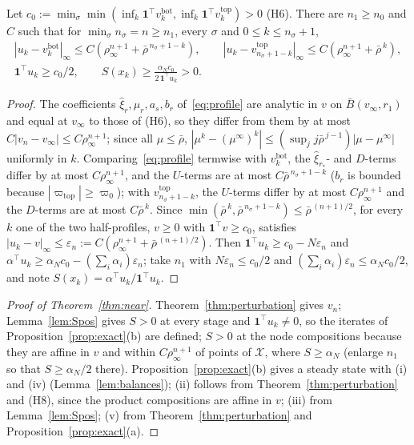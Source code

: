 \documentclass[11pt,a4paper]{report}
\newcommand{\cX}{\mathcal X}
\newcommand{\one}{\mathbf 1}
\newcommand{\piv}{\varpi}
\begin{document}
\begin{lemma}\label{lem:Spos}
Let \(c_0:=\min_\sigma\min(\inf_k\one^\top v^{\mathrm{bot}}_k,\inf_k\one^\top v^{\mathrm{top}}_k)>0\) (H6). There are \(n_1\ge n_0\) and \(C\) such that for
\(\min_\sigma n_\sigma=n\ge n_1\), every \(\sigma\) and \(0\le k\le n_\sigma+1\),
\begin{gather*}
|u_k-v^{\mathrm{bot}}_k|_\infty\le C(\rho_\infty^{n+1}+\bar\rho^{\,n_\sigma+1-k}),\qquad
|u_k-v^{\mathrm{top}}_{n_\sigma+1-k}|_\infty\le C(\rho_\infty^{n+1}+\bar\rho^{\,k}),\\
\one^\top u_k\ge c_0/2,\qquad S(x_k)\ge\frac{\alpha_Nc_0}{2\,\one^\top u_k}>0 .
\end{gather*}
\end{lemma}
\begin{proof}
The coefficients \(\hat\xi_r,\mu_r,a_s,b_r\) of~\eqref{eq:profile} are analytic in \(v\) on \(\bar B(v_\infty,r_1)\) and equal at \(v_\infty\) to those of
(H6), so they differ from them by at most \(C|v_n-v_\infty|\le C\rho_\infty^{n+1}\); since all \(\mu\le\bar\rho\),
\(|\mu^k-(\mu^\infty)^k|\le(\sup_jj\bar\rho^{\,j-1})|\mu-\mu^\infty|\) uniformly in \(k\). Comparing~\eqref{eq:profile} termwise with
\(v^{\mathrm{bot}}_k\), the \(\hat\xi_{r_*}\)- and \(D\)-terms differ by at most \(C\rho_\infty^{n+1}\), and the \(U\)-terms are at most
\(C\bar\rho^{\,n_\sigma+1-k}\) (\(b_r\) is bounded because \(|\piv_{\mathrm{top}}|\ge\piv_0\)); with \(v^{\mathrm{top}}_{n_\sigma+1-k}\), the \(U\)-terms differ by at
most \(C\rho_\infty^{n+1}\) and the \(D\)-terms are at most \(C\bar\rho^{\,k}\). Since \(\min(\bar\rho^{\,k},\bar\rho^{\,n_\sigma+1-k})\le\bar\rho^{\,(n+1)/2}\),
for every \(k\) one of the two half-profiles, \(v\ge0\) with \(\one^\top v\ge c_0\), satisfies \(|u_k-v|_\infty\le\varepsilon_n:=C(\rho_\infty^{n+1}+\bar\rho^{\,(n+1)/2})\).
Then \(\one^\top u_k\ge c_0-N\varepsilon_n\) and \(\alpha^\top u_k\ge\alpha_Nc_0-(\sum_i\alpha_i)\varepsilon_n\); take \(n_1\) with \(N\varepsilon_n\le c_0/2\) and
\((\sum_i\alpha_i)\varepsilon_n\le\alpha_Nc_0/2\), and note \(S(x_k)=\alpha^\top u_k/\one^\top u_k\).
\end{proof}

\begin{proof}[Proof of Theorem~\ref{thm:near}]
Theorem~\ref{thm:perturbation} gives \(v_n\); Lemma~\ref{lem:Spos} gives \(S>0\) at every stage and \(\one^\top u_k\ne0\), so the iterates of
Proposition~\ref{prop:exact}(b) are defined; \(S>0\) at the node compositions because they are affine in \(v\) and within
\(C\rho_\infty^{n+1}\) of points of \(\cX\), where \(S\ge\alpha_N\) (enlarge \(n_1\) so that \(S\ge\alpha_N/2\) there). Proposition~\ref{prop:exact}(b) gives a steady state with (i) and (iv)
(Lemma~\ref{lem:balances}); (ii) follows from Theorem~\ref{thm:perturbation} and (H8), since the product compositions are affine in \(v\);
(iii) from Lemma~\ref{lem:Spos}; (v) from Theorem~\ref{thm:perturbation} and Proposition~\ref{prop:exact}(a).
\end{proof}
\end{document}
